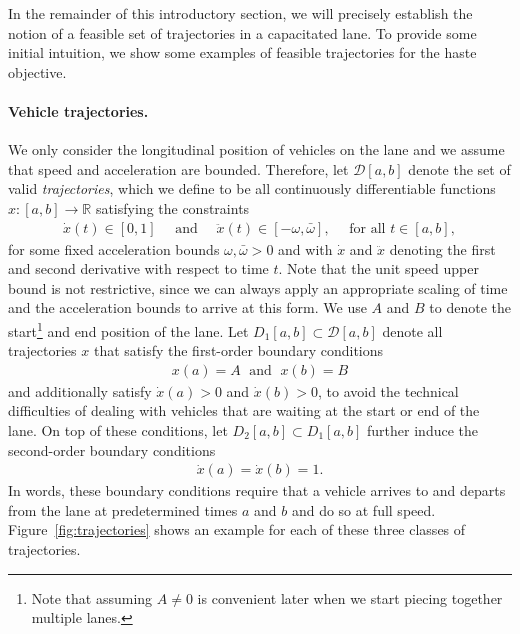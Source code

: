 \documentclass[a4paper]{report}
\theoremstyle{definition}
\theoremstyle{plain}
\begin{document}
In the remainder of this introductory section, we will precisely establish the
notion of a feasible set of trajectories in a capacitated lane. To provide some
initial intuition, we show some examples of feasible trajectories for the haste
objective.


\paragraph{Vehicle trajectories.}
We only consider the longitudinal position of vehicles on the lane and we assume
that speed and acceleration are bounded. Therefore, let $\mathcal{D}[a,b]$
denote the set of valid \emph{trajectories}, which we define to be all continuously
differentiable functions $x : [a,b] \rightarrow \mathbb{R}$ satisfying the constraints
\begin{align}
  \dot{x}(t) \in [0, 1] \quad \text{ and } \quad
  \ddot{x}(t) \in [{-\omega} ,\bar{\omega}] , \quad \text{ for all } t \in [a,b] ,
\end{align}
for some fixed acceleration bounds $\omega, \bar{\omega} > 0$ and with $\dot{x}$ and
$\ddot{x}$ denoting the first and second derivative with respect to time $t$.
Note that the unit speed upper bound is not restrictive, since we can always
apply an appropriate scaling of time and the acceleration bounds to arrive at
this form.
%
We use $A$ and $B$ to denote the start\footnote{Note that assuming $A\neq 0$ is convenient later when we start piecing together multiple lanes.} and end position of the lane.
%
Let $D_{1}[a, b] \subset \mathcal{D}[a, b]$ denote all trajectories $x$ that satisfy
the first-order boundary conditions
\begin{align}
  x(a) = A \; \text{ and } \; x(b) = B
\end{align}
and additionally satisfy $\dot{x}(a) > 0$ and $\dot{x}(b) > 0$, to avoid the
technical difficulties of dealing with vehicles that are waiting at the start or
end of the lane.
%
On top of these conditions, let $D_{2}[a,b] \subset D_{1}[a, b]$ further induce the
second-order boundary conditions
\begin{align}
  \dot{x}(a) = \dot{x}(b) = 1 .
\end{align}
In words, these boundary conditions require that a vehicle arrives to and
departs from the lane at predetermined times $a$ and $b$ and do so at full
speed.
%
Figure~\ref{fig:trajectories} shows an example for each of these three classes of trajectories.
\end{document}
